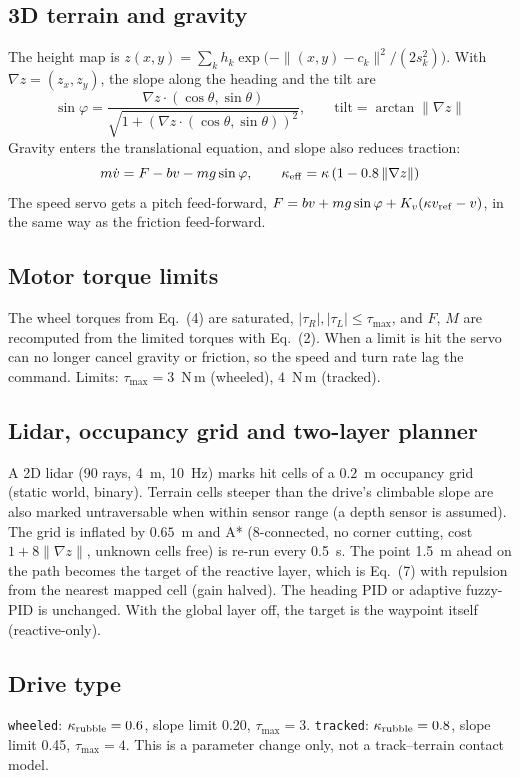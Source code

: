 \documentclass[11pt,a4paper]{article}
\begin{document}
\subsection{3D terrain and gravity}
The height map is $z(x,y)=\sum_k h_k\exp\!\big(-\|(x,y)-c_k\|^2/(2s_k^2)\big)$. With $\nabla z=(z_x,z_y)$, the slope along the heading and the tilt are
\begin{equation}
\sin\varphi=\frac{\nabla z\cdot(\cos\theta,\sin\theta)}{\sqrt{1+(\nabla z\cdot(\cos\theta,\sin\theta))^2}},\qquad \text{tilt}=\arctan\|\nabla z\|
\end{equation}
Gravity enters the translational equation, and slope also reduces traction:
\begin{equation}
m\dot v=F-bv-mg\sin\varphi,\qquad \kappa_{\rm eff}=\kappa\,(1-0.8\,\|\nabla z\|)
\end{equation}
The speed servo gets a pitch feed-forward, $F=bv+mg\sin\varphi+K_v(\kappa v_{\rm ref}-v)$, in the same way as the friction feed-forward.

\subsection{Motor torque limits}
The wheel torques from Eq.~(4) are saturated, $|\tau_R|,|\tau_L|\le\tau_{\max}$, and $F$, $M$ are recomputed from the limited torques with Eq.~(2). When a limit is hit the servo can no longer cancel gravity or friction, so the speed and turn rate lag the command. Limits: $\tau_{\max}=3$~N\,m (wheeled), $4$~N\,m (tracked).

\subsection{Lidar, occupancy grid and two-layer planner}
A 2D lidar (90 rays, 4~m, 10~Hz) marks hit cells of a $0.2$~m occupancy grid (static world, binary). Terrain cells steeper than the drive's climbable slope are also marked untraversable when within sensor range (a depth sensor is assumed). The grid is inflated by $0.65$~m and A* (8-connected, no corner cutting, cost $1+8\|\nabla z\|$, unknown cells free) is re-run every 0.5~s. The point 1.5~m ahead on the path becomes the target of the reactive layer, which is Eq.~(7) with repulsion from the nearest mapped cell (gain halved). The heading PID or adaptive fuzzy-PID is unchanged. With the global layer off, the target is the waypoint itself (reactive-only).

\subsection{Drive type}
\texttt{wheeled}: $\kappa_{\rm rubble}=0.6$, slope limit 0.20, $\tau_{\max}=3$. \texttt{tracked}: $\kappa_{\rm rubble}=0.8$, slope limit 0.45, $\tau_{\max}=4$. This is a parameter change only, not a track--terrain contact model.
\end{document}
